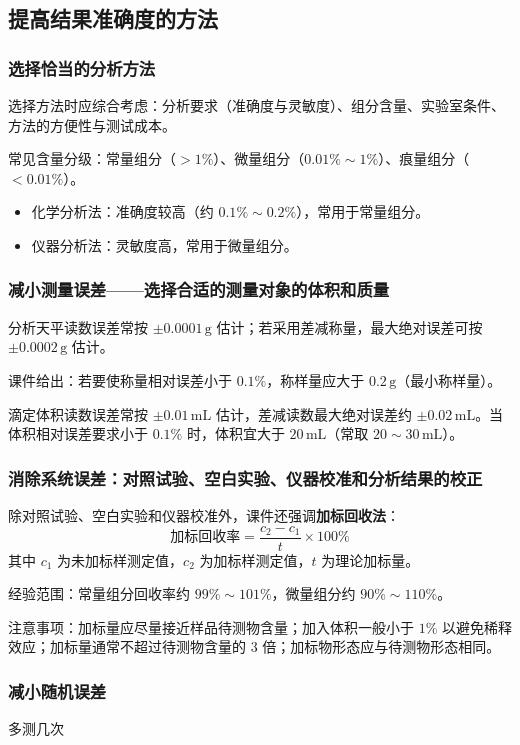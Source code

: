\documentclass[12pt,a4paper]{article}
\numberwithin{equation}{section}
\begin{document}
\subsection{提高结果准确度的方法}
\subsubsection{选择恰当的分析方法}
选择方法时应综合考虑：分析要求（准确度与灵敏度）、组分含量、实验室条件、方法的方便性与测试成本。

常见含量分级：常量组分（$>1\%$）、微量组分（$0.01\%\sim1\%$）、痕量组分（$<0.01\%$）。

\begin{itemize}
    \item 化学分析法：准确度较高（约 $0.1\%\sim0.2\%$），常用于常量组分。
    \item 仪器分析法：灵敏度高，常用于微量组分。
\end{itemize}
\subsubsection{减小测量误差——选择合适的测量对象的体积和质量}
分析天平读数误差常按 $\pm0.0001\,\mathrm{g}$ 估计；若采用差减称量，最大绝对误差可按 $\pm0.0002\,\mathrm{g}$ 估计。

课件给出：若要使称量相对误差小于 $0.1\%$，称样量应大于 $0.2\,\mathrm{g}$（最小称样量）。

滴定体积读数误差常按 $\pm0.01\,\mathrm{mL}$ 估计，差减读数最大绝对误差约 $\pm0.02\,\mathrm{mL}$。当体积相对误差要求小于 $0.1\%$ 时，体积宜大于 $20\,\mathrm{mL}$（常取 $20\sim30\,\mathrm{mL}$）。
\subsubsection{消除系统误差：对照试验、空白实验、仪器校准和分析结果的校正}
除对照试验、空白实验和仪器校准外，课件还强调\textbf{加标回收法}：
\begin{equation}
\text{加标回收率}=\frac{c_2-c_1}{t}\times100\%
\end{equation}
其中 $c_1$ 为未加标样测定值，$c_2$ 为加标样测定值，$t$ 为理论加标量。

经验范围：常量组分回收率约 $99\%\sim101\%$，微量组分约 $90\%\sim110\%$。

注意事项：加标量应尽量接近样品待测物含量；加入体积一般小于 $1\%$ 以避免稀释效应；加标量通常不超过待测物含量的 $3$ 倍；加标物形态应与待测物形态相同。
\subsubsection{减小随机误差}多测几次
\end{document}
